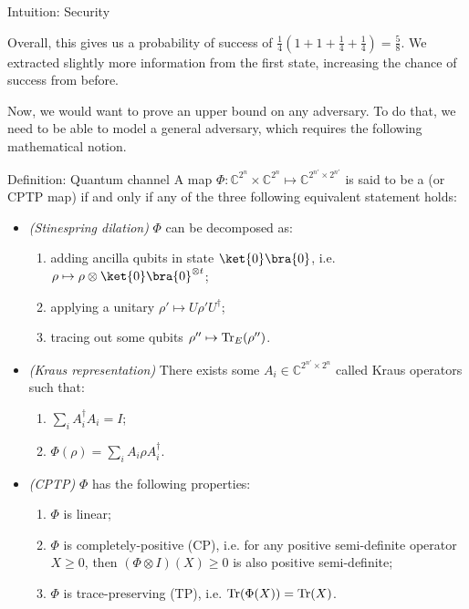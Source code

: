 \documentclass[a4paper]{article}
\begin{document}
\begin{parag}{Intuition: Security}
\begin{itemize}[left=0pt]
            Overall, this gives us a probability of success of $\frac{1}{4}\left(1 + 1 + \frac{1}{4} + \frac{1}{4}\right) = \frac{5}{8}$. We extracted slightly more information from the first state, increasing the chance of success from before.
    \end{itemize}

    Now, we would want to prove an upper bound on any adversary. To do that, we need to be able to model a general adversary, which requires the following mathematical notion.
\end{parag}

\begin{parag}{Definition: Quantum channel}
    A map $\Phi: \mathbb{C}^{2^n} \times \mathbb{C}^{2^n} \mapsto \mathbb{C}^{2^{n'} \times 2^{n'}}$ is said to be a  (or CPTP map) if and only if any of the three following equivalent statement holds:
    \begin{itemize}[left=0pt]
        \item \textit{(Stinespring dilation)} $\Phi$ can be decomposed as:
            \begin{enumerate}
                \item adding ancilla qubits in state $\ket{0}\bra{0}$, i.e. $\rho \mapsto \rho \otimes \ket{0}\bra{0}^{\otimes t}$;
                \item applying a unitary $\rho' \mapsto U \rho' U^{\dagger}$;
                \item tracing out some qubits $\rho'' \mapsto \Tr_E\left(\rho''\right)$.
            \end{enumerate}
        \item \textit{(Kraus representation)} There exists some $A_i \in \mathbb{C}^{2^{n'} \times 2^n}$ called Kraus operators such that:
            \begin{enumerate}
                \item $\sum_{i} A_i^{\dagger} A_i = I$;
                \item $\Phi\left(\rho\right) = \sum_{i} A_i \rho A_i^{\dagger}$.
            \end{enumerate}
        \item \textit{(CPTP)} $\Phi$ has the following properties:
            \begin{enumerate}
                \item $\Phi$ is linear;
                \item $\Phi$ is completely-positive (CP), i.e. for any positive semi-definite operator $X \geq 0$, then $\left(\Phi \otimes I\right)\left(X\right) \geq 0$ is also positive semi-definite;
                \item $\Phi$ is trace-preserving (TP), i.e. $\Tr\left(\Phi\left(X\right)\right) = \Tr\left(X\right)$. 
            \end{enumerate}
    \end{itemize}


\end{parag}
\end{document}

